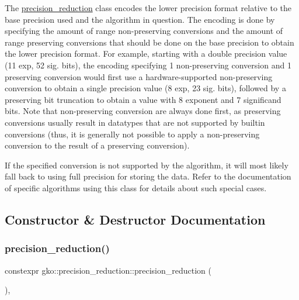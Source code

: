 The \hyperlink{classgko_1_1precision__reduction}{precision\+\_\+reduction} class encodes the lower precision format relative to the base precision used and the algorithm in question. The encoding is done by specifying the amount of range non-\/preserving conversions and the amount of range preserving conversions that should be done on the base precision to obtain the lower precision format. For example, starting with a double precision value (11 exp, 52 sig. bits), the encoding specifying 1 non-\/preserving conversion and 1 preserving conversion would first use a hardware-\/supported non-\/preserving conversion to obtain a single precision value (8 exp, 23 sig. bits), followed by a preserving bit truncation to obtain a value with 8 exponent and 7 significand bits. Note that non-\/preserving conversion are always done first, as preserving conversions usually result in datatypes that are not supported by builtin conversions (thus, it is generally not possible to apply a non-\/preserving conversion to the result of a preserving conversion).

If the specified conversion is not supported by the algorithm, it will most likely fall back to using full precision for storing the data. Refer to the documentation of specific algorithms using this class for details about such special cases. 

\subsection{Constructor \& Destructor Documentation}
\mbox{\label{classgko_1_1precision__reduction_a371fe028770edee40c013d1a45365aa2}} 
\subsubsection{\texorpdfstring{precision\+\_\+reduction()}{precision\_reduction()}\hspace{0.1cm}{\footnotesize\ttfamily [1/2]}}
{\footnotesize\ttfamily constexpr gko\+::precision\+\_\+reduction\+::precision\+\_\+reduction (\begin{DoxyParamCaption}{ }\end{DoxyParamCaption})\hspace{0.3cm}{\ttfamily [inline]}, {\ttfamily [noexcept]}}



